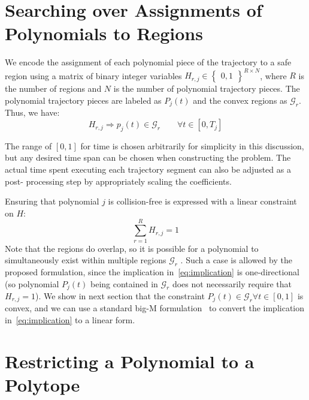 \section{Searching over Assignments of Polynomials to Regions}

We encode the assignment of each polynomial piece of the
trajectory to a safe region using a matrix of binary integer variables ${H_{r,j}} \in \begin{Bmatrix}0,1 \end{Bmatrix}^{R \times N}$, where $R$ is the number of regions and $N$ is the number of polynomial trajectory pieces.
The polynomial trajectory pieces are labeled as $P_{j}(t)$ and the
convex regions as $\mathcal{G}_{r}$. Thus, we have:\begin{equation} \label{eq:implication}
{H_{r,j}} \Rightarrow {p_{j}}(t) \in \mathcal{G}_r \qquad \forall t \in [0,T_j]
\end{equation}

The range of $[0, 1]$ for time is chosen arbitrarily for simplicity in this
discussion, but any desired time span can be chosen when
constructing the problem. The actual time spent executing
each trajectory segment can also be adjusted as a post-
processing step by appropriately scaling the coefficients. 

Ensuring that polynomial $j$ is collision-free is expressed
with a linear constraint on $H$:\begin{equation} \label{eq:summation_Hrj}
\sum_{r=1}^{R}H_{r,j} = 1
\end{equation}
Note that the regions do overlap, so it is possible
for a polynomial to simultaneously exist within multiple
regions $\mathcal{G}_{r}$ . Such a case is allowed by the proposed formulation, since the implication in~\ref{eq:implication} is one-directional (so polynomial $P_j(t)$ being contained in $\mathcal{G}_r$ does not necessarily require that $H_{r,j} = 1$). We show in next section that the constraint $P_{j}(t) \in \mathcal{G}_{r} \forall t \in [0, 1]$ is convex, and we can use a standard big-M formulation~\cite{lofberg2004yalmip} to convert the implication in~\ref{eq:implication} to a linear
form. 

\section{Restricting a Polynomial to a Polytope}

